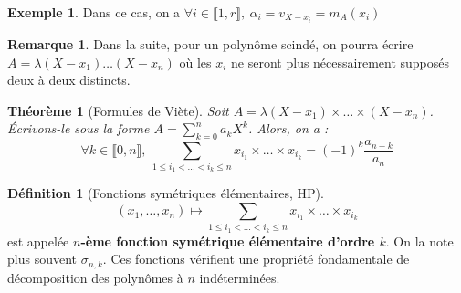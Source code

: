 \documentclass[french]{book}
\theoremstyle{plain}
\newtheorem{thm}{Théorème}[chapter]
\theoremstyle{definition}
\newtheorem{dfn}{Définition}[chapter]
\newtheorem{exa}{Exemple}[chapter]
\newtheorem{rmq}{Remarque}[chapter]
\theoremstyle{remark}
\begin{document}
\begin{exa}
	Dans ce cas, on a $\forall i\in\llbracket1,r\rrbracket,\ \alpha_i=v_{X-x_i}=m_A(x_i)$
\end{exa}
\begin{rmq}
	Dans la suite, pour un polynôme scindé, on pourra écrire $A=\lambda(X-x_1)\ldots(X-x_n)$ où les $x_i$ ne seront plus nécessairement supposés deux à deux distincts.
\end{rmq}
\begin{thm}[Formules de Viète]
	Soit $A=\lambda(X-x_1)\times\ldots\times(X-x_n)$. Écrivons-le sous la forme $A=\displaystyle\sum_{k=0}^{n}a_kX^k$. Alors, on a : $$\forall k\in\llbracket0,n\rrbracket, \ \sum_{1\leqslant i_1<\ldots<i_k\leqslant n}x_{i_1}\times\ldots\times x_{i_k}=(-1)^k\frac{a_{n-k}}{a_n}$$
\end{thm}
\begin{dfn}[Fonctions symétriques élémentaires, HP]
	$$(x_1,\ldots,x_n)\mapsto \displaystyle\sum_{1\leqslant i_1<\ldots<i_k\leqslant n}x_{i_1}\times\ldots\times x_{i_k}$$ est appelée \textbf{$n$-ème fonction symétrique élémentaire d'ordre $k$}. On la note plus souvent $\sigma_{n,k}$.  Ces fonctions vérifient une propriété fondamentale de décomposition des polynômes à $n$ indéterminées.
\end{dfn}
\end{document}
